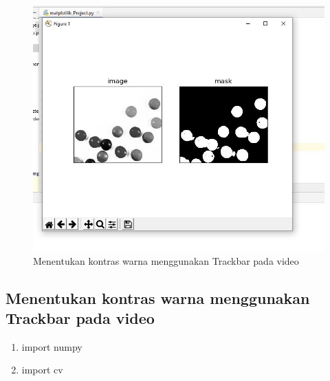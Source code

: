 \newpage
\begin{figure}[ht]
\centering
\includegraphics[scale=0.5]{figures/2,51.jpg}
\caption{Menentukan kontras warna menggunakan Trackbar pada video}
\label{contoh}
\end{figure}








\newpage
\subsection{Menentukan kontras warna menggunakan Trackbar pada video}

\begin{enumerate}
	\item import numpy
	\item import cv
\end{enumerate}

